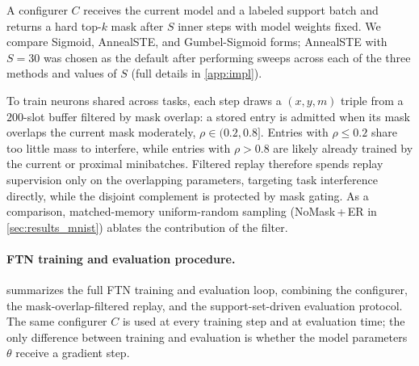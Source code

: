\documentclass[11pt]{article}
\begin{document}
A configurer $C$ receives the current model and a labeled support batch and returns a hard top-$k$ mask after $S$ inner steps with model weights fixed. We compare Sigmoid, AnnealSTE, and Gumbel-Sigmoid forms; AnnealSTE with $S{=}30$ was chosen as the default after performing sweeps across each of the three methods and values of $S$ (full details in \cref{app:impl}).

To train neurons shared across tasks, each step draws a $(x,y,m)$ triple from a $200$-slot buffer filtered by mask overlap: a stored entry is admitted when its mask overlaps the current mask moderately, $\rho \in (0.2, 0.8]$. Entries with $\rho \le 0.2$ share too little mass to interfere, while entries with $\rho > 0.8$ are likely already trained by the current or proximal minibatches. Filtered replay therefore spends replay supervision only on the overlapping parameters, targeting task interference directly, while the disjoint complement is protected by mask gating. As a comparison, matched-memory uniform-random sampling (NoMask\,+\,ER in \cref{sec:results_mnist}) ablates the contribution of the filter.

\paragraph{FTN training and evaluation procedure.}
 summarizes the full FTN training and evaluation loop, combining the configurer, the mask-overlap-filtered replay, and the support-set-driven evaluation protocol. The same configurer $C$ is used at every training step and at evaluation time; the only difference between training and evaluation is whether the model parameters $\theta$ receive a gradient step.
\end{document}
